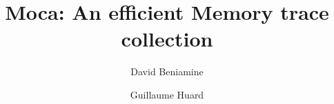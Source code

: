 \documentclass{article}
\author{David Beniamine \and Guillaume Huard}
\title{Moca: An efficient Memory trace collection }
\newcommand{\Input}[1]{}
\begin{document}
\maketitle

\Input{intro.tex}
\Input{related.tex}
\Input{design.tex}
\Input{experiment.tex}
\Input{cncl.tex}

%

\end{document}
